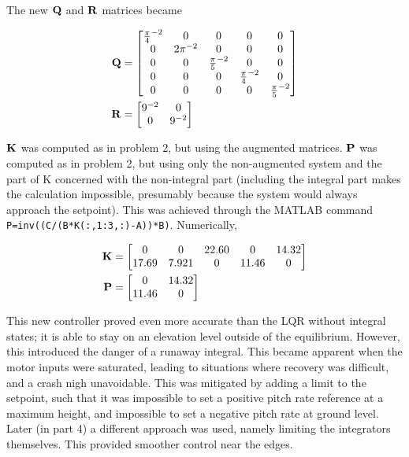 The new $\mathbf{Q}$ and $\mathbf{R}$ matrices became

\begin{subequations}
	 \begin{align}
	   \mathbf{Q} &= \begin{bmatrix}
	   	\frac{\pi}{4}^{-2} & 0 & 0 & 0 & 0\\
	   	0 & 2\pi^{-2} & 0 & 0 & 0\\
	   	0&0& \frac{\pi}{5}^{-2} & 0 & 0\\
	   	0&0&0& \frac{\pi}{4}^{-2} & 0\\
	   	0&0&0&0& \frac{\pi}{5}^{-2} \\
	   \end{bmatrix}\\
	   \mathbf{R} &= \begin{bmatrix}
	   	9^{-2} & 0 \\
	   	0 & 9^{-2}
	   \end{bmatrix}
	 \end{align}
\end{subequations}

$\mathbf{K}$ was computed as in problem 2, but using the augmented matrices. $\mathbf{P}$ was computed as in problem 2, but using only the non-augmented system and the part of K concerned with the non-integral part (including the integral part makes the calculation impossible, presumably because the system would always approach the setpoint). This was achieved through the MATLAB command \texttt{P=inv((C/(B*K(:,1:3,:)-A))*B)}. Numerically, 

\begin{subequations}
	 \begin{align}
	   \mathbf{K} &= \begin{bmatrix}
	   	0		&0		&22.60	&0		&14.32 \\
		17.69	&7.921	&0		&11.46	&0
	   \end{bmatrix} \\
	   \mathbf{P} &= \begin{bmatrix}
	   	0&	14.32 \\
		11.46&	0
	   \end{bmatrix}
	 \end{align}
\end{subequations}

This new controller proved even more accurate than the LQR without integral states; it is able to stay on an elevation level outside of the equilibrium. However, this introduced the danger of a runaway integral. This became apparent when the motor inputs were saturated, leading to situations where recovery was difficult, and a crash nigh unavoidable. This was mitigated by adding a limit to the setpoint, such that it was impossible to set a positive pitch rate reference at a maximum height, and impossible to set a negative pitch rate at ground level. Later (in part 4) a different approach was used, namely limiting the integrators themselves. This provided smoother control near the edges.